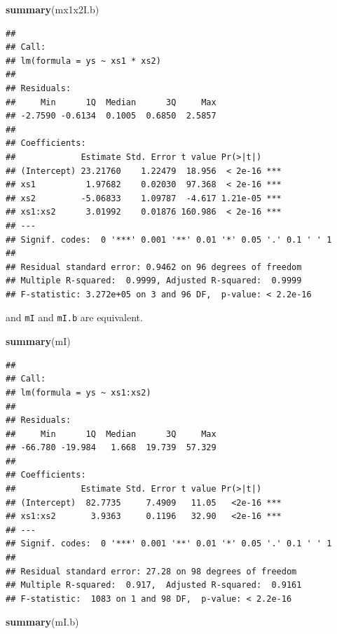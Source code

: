 \documentclass[
]{book}
\newenvironment{Shaded}{\begin{snugshade}}{\end{snugshade}}
\newcommand{\KeywordTok}[1]{\textcolor[rgb]{0.13,0.29,0.53}{\textbf{#1}}}
\newcommand{\NormalTok}[1]{#1}
\begin{document}
\begin{Shaded}
\begin{Highlighting}[]
\KeywordTok{summary}\NormalTok{(mx1x2I.b)}
\end{Highlighting}
\end{Shaded}

\begin{verbatim}
## 
## Call:
## lm(formula = ys ~ xs1 * xs2)
## 
## Residuals:
##     Min      1Q  Median      3Q     Max 
## -2.7590 -0.6134  0.1005  0.6850  2.5857 
## 
## Coefficients:
##             Estimate Std. Error t value Pr(>|t|)    
## (Intercept) 23.21760    1.22479  18.956  < 2e-16 ***
## xs1          1.97682    0.02030  97.368  < 2e-16 ***
## xs2         -5.06833    1.09787  -4.617 1.21e-05 ***
## xs1:xs2      3.01992    0.01876 160.986  < 2e-16 ***
## ---
## Signif. codes:  0 '***' 0.001 '**' 0.01 '*' 0.05 '.' 0.1 ' ' 1
## 
## Residual standard error: 0.9462 on 96 degrees of freedom
## Multiple R-squared:  0.9999,	Adjusted R-squared:  0.9999 
## F-statistic: 3.272e+05 on 3 and 96 DF,  p-value: < 2.2e-16
\end{verbatim}

and \texttt{mI} and \texttt{mI.b} are equivalent.

\begin{Shaded}
\begin{Highlighting}[]
\KeywordTok{summary}\NormalTok{(mI)}
\end{Highlighting}
\end{Shaded}

\begin{verbatim}
## 
## Call:
## lm(formula = ys ~ xs1:xs2)
## 
## Residuals:
##     Min      1Q  Median      3Q     Max 
## -66.780 -19.984   1.668  19.739  57.329 
## 
## Coefficients:
##             Estimate Std. Error t value Pr(>|t|)    
## (Intercept)  82.7735     7.4909   11.05   <2e-16 ***
## xs1:xs2       3.9363     0.1196   32.90   <2e-16 ***
## ---
## Signif. codes:  0 '***' 0.001 '**' 0.01 '*' 0.05 '.' 0.1 ' ' 1
## 
## Residual standard error: 27.28 on 98 degrees of freedom
## Multiple R-squared:  0.917,	Adjusted R-squared:  0.9161 
## F-statistic:  1083 on 1 and 98 DF,  p-value: < 2.2e-16
\end{verbatim}

\begin{Shaded}
\begin{Highlighting}[]
\KeywordTok{summary}\NormalTok{(mI.b)}
\end{Highlighting}
\end{Shaded}
\end{document}
